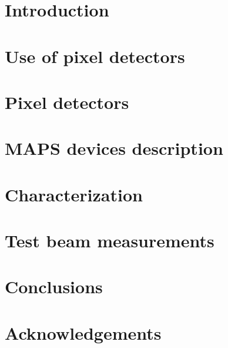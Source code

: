 \documentclass[a4paper,11pt]{report}
\begin{document}
\pagestyle{fancy}
\renewcommand{\chaptermark}[1]{\markboth{#1}{#1}}
\fancyhead[R]{}
\fancyhead[L]{\ifnum\value{chapter}=0\else\chaptername\ \thechapter\ \fi \ \leftmark}



\tableofcontents

\chapter*{Introduction}


\chapter{Use of pixel detectors}\label{chap:usage_of_pixels}


\chapter{Pixel detectors}\label{chap:pixel}


\chapter{MAPS devices description}\label{chap:Monopix_Arcadia}



\chapter{Characterization}


\chapter{Test beam measurements}



\chapter{Conclusions}


\chapter{Acknowledgements}


\printbibliography[heading=bibintoc, title={Bibliography}] 
\end{document}
